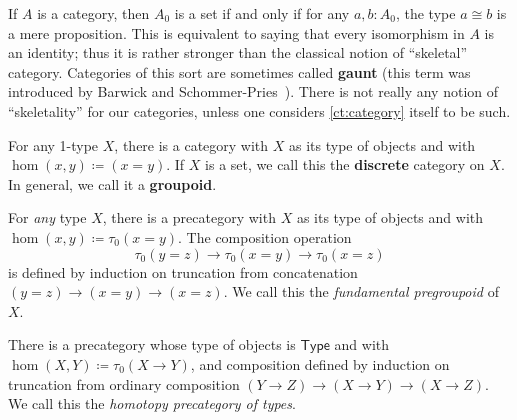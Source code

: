 \documentclass{amsart}
\newcommand{\defeq}{\coloneqq}  %
\newcommand{\type}{\ensuremath{\mathsf{Type}}\xspace}
\newcommand{\trunc}[2]{\tau_{#1}(#2)}
\def\pizero{\trunc0}
\theoremstyle{definition}
\theoremstyle{remark}
\numberwithin{equation}{section}
\begin{document}
\begin{eg}\label{ct:gaunt}
  If $A$ is a category, then $A_0$ is a set if and only if for any $a,b:A_0$, the type $a\cong b$ is a mere proposition.
  This is equivalent to saying that every isomorphism in $A$ is an identity; thus it is rather stronger than the classical notion of ``skeletal'' category.
  Categories of this sort are sometimes called \textbf{gaunt} (this term was introduced by Barwick and Schommer-Pries~\cite{bsp12infncats}).
  There is not really any notion of ``skeletality'' for our categories, unless one considers \autoref{ct:category} itself to be such.
\end{eg}

\begin{eg}\label{ct:discrete}
  For any 1-type $X$, there is a category with $X$ as its type of objects and with $\hom(x,y) \defeq (x=y)$.
  If $X$ is a set, we call this the \textbf{discrete} category on $X$.
  In general, we call it a \textbf{groupoid}.
\end{eg}

\begin{eg}\label{ct:fundgpd}
  For \emph{any} type $X$, there is a precategory with $X$ as its type of objects and with $\hom(x,y) \defeq \pizero{x=y}$.
  The composition operation
  \[ \pizero{y=z} \to \pizero{x=y} \to \pizero{x=z} \]
  is defined by induction on truncation from concatenation $(y=z)\to(x=y)\to(x=z)$.
  We call this the \emph{fundamental pregroupoid} of $X$.
\end{eg}

\begin{eg}\label{ct:hoprecat}
  There is a precategory whose type of objects is \type and with $\hom(X,Y) \defeq \pizero{X\to Y}$, and composition defined by induction on truncation from ordinary composition $(Y\to Z) \to (X\to Y) \to (X\to Z)$.
  We call this the \emph{homotopy precategory of types}.
\end{eg}
\end{document}
